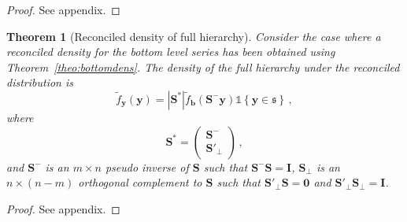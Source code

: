 \documentclass[12pt]{article}
\newtheorem{theo}{Theorem}[section]
\theoremstyle{definition}
\begin{document}
\begin{proof}
	See appendix.
\end{proof}

\begin{theo}[Reconciled density of full hierarchy]\label{theo:fulldens}
	Consider the case where a reconciled density for the bottom level series has been obtained using Theorem~\ref{theo:bottomdens}.  The density of the full hierarchy under the reconciled distribution is
	\[
	\tilde{f}_{\bm{y}}(\bm{y})=|\bm{S^*}|\tilde{f}_{\bm b}({\bm{S^-}\bm{y}})\mathbb{1}\left\{\bm{y}\in\mathfrak{s}\right\}\,,
	\]
	where
	\[\bm{S^*}=\begin{pmatrix}\bm{S}^-\\\bm{S}'_\perp\end{pmatrix}\,,\]
	and $\bm{S^-}$ is an $m\times n$ pseudo inverse of $\bm{S}$ such that $\bm{S}^-\bm{S}=\bm{I}$, $\bm{S_\perp}$ is an $n\times (n-m)$ orthogonal complement to $\bm{S}$ such that $\bm{S}'_\perp\bm{S}=\bm{0}$ and $\bm{S}'_\perp\bm{S}_\perp=\bm{I}$. 
\end{theo}

\begin{proof}
	See appendix.
\end{proof}



\end{document}
